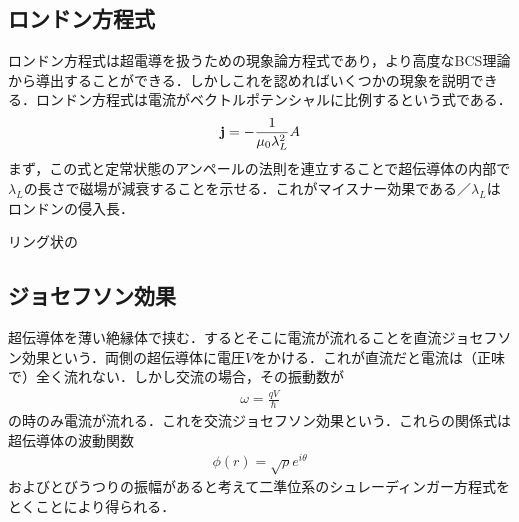 \documentclass[a4j]{jarticle}
\begin{document}
\subsection{ロンドン方程式}
ロンドン方程式は超電導を扱うための現象論方程式であり，より高度なBCS理論から導出することができる．しかしこれを認めればいくつかの現象を説明できる．ロンドン方程式は電流がベクトルポテンシャルに比例するという式である．
\begin{align*}
 {\bf j}=-\frac{1}{\mu_0\lambda_L^2}A
\end{align*}
まず，この式と定常状態のアンペールの法則を連立することで超伝導体の内部で$\lambda_L$の長さで磁場が減衰することを示せる．これがマイスナー効果である／$\lambda_L$はロンドンの侵入長．

リング状の



\subsection{ジョセフソン効果}
超伝導体を薄い絶縁体で挟む．するとそこに電流が流れることを直流ジョセフソン効果という．両側の超伝導体に電圧$V$をかける．これが直流だと電流は（正味で）全く流れない．しかし交流の場合，その振動数が
\begin{align*}
 \omega =\frac{qV}{\hbar}
\end{align*}
の時のみ電流が流れる．これを交流ジョセフソン効果という．これらの関係式は超伝導体の波動関数
\begin{align*}
 \phi (r)=\sqrt{\rho}e^{i\theta}
\end{align*}
およびとびうつりの振幅があると考えて二準位系のシュレーディンガー方程式をとくことにより得られる．
\end{document}
